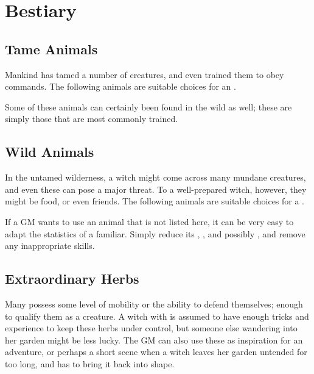 \chapter{Bestiary}

\section{Tame Animals}

Mankind has tamed a number of creatures, and even trained them to obey commands.
The following animals are suitable choices for an .

Some of these animals can certainly been found in the wild as well; these are simply those that are most commonly trained.


\section{Wild Animals}

In the untamed wilderness, a witch might come across many mundane creatures, and even these can pose a major threat.
To a well-prepared witch, however, they might be food, or even friends.
The following animals are suitable choices for a .

If a GM wants to use an animal that is not listed here, it can be very easy to adapt the statistics of a familiar.
Simply reduce its , , and possibly , and remove any inappropriate skills.



\section{Extraordinary Herbs}

Many  possess some level of mobility or the ability to defend themselves; enough to qualify them as a creature.
A witch with  is assumed to have enough tricks and experience to keep these herbs under control, but someone else wandering into her garden might be less lucky.
The GM can also use these as inspiration for an adventure, or perhaps a short scene when a witch leaves her garden untended for too long, and has to bring it back into shape.
